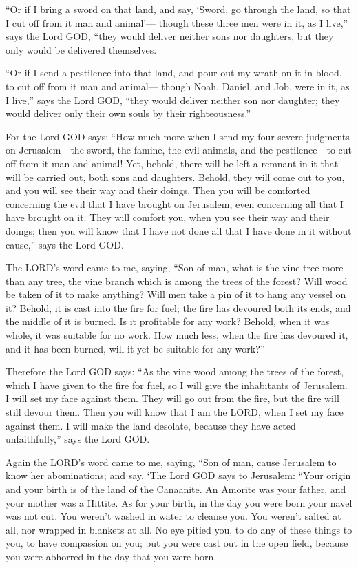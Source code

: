 \myverse{}“Or if I bring a sword on that land, and say, ‘Sword, go through
the land, so that I cut off from it man and animal’—
\myverse{}though these three men were in it, as I live,” says the Lord GOD, “they would
deliver neither sons nor daughters, but they only would be delivered themselves.

\myverse{}“Or if I send a pestilence into that land, and pour out my wrath
on it in blood, to cut off from it man and animal—
\myverse{}though Noah, Daniel, and Job, were in it, as I live,” says the Lord GOD,
“they would deliver neither son nor daughter; they would deliver only their own souls by their righteousness.”

\myverse{}For the Lord GOD says: “How much more when I send my four severe
judgments on Jerusalem—the sword, the famine, the evil animals, and the pestilence—to cut off from it
man and animal!
\myverse{}Yet, behold, there will be left a remnant in it that will be carried out,
both sons and daughters. Behold, they will come out to you, and you will see their way and their doings.
Then you will be comforted concerning the evil that I have brought on Jerusalem, even concerning all that
I have brought on it.
\myverse{}They will comfort you, when you see their way and their doings; then you
will know that I have not done all that I have done in it without cause,” says the Lord GOD.


\mychapter{} \myverse*{}The LORD’s word came to me, saying,
\myverse{}“Son of man, what is the vine tree more than any tree, the vine branch which
is among the trees of the forest?
\myverse{}Will wood be taken of it to make anything? Will men take a pin of it to hang
any vessel on it?
\myverse{}Behold, it is cast into the fire for fuel; the fire has devoured both its ends,
and the middle of it is burned. Is it profitable for any work?
\myverse{}Behold, when it was whole, it was suitable for no work. How much less, when
the fire has devoured it, and it has been burned, will it yet be suitable for any work?”

\myverse{}Therefore the Lord GOD says: “As the vine wood among the trees
of the forest, which I have given to the fire for fuel, so I will give the inhabitants of Jerusalem.
\myverse{}I will set my face against them. They will go out from the fire, but the fire
will still devour them. Then you will know that I am the LORD, when I set my face against them.
\myverse{}I will make the land desolate, because they have acted unfaithfully,” says
the Lord GOD.


\mychapter{} \myverse*{}Again the LORD’s word came to me, saying,
\myverse{}“Son of man, cause Jerusalem to know her abominations;
\myverse{}and say, ‘The Lord GOD says to Jerusalem: “Your origin and your birth is of
the land of the Canaanite. An Amorite was your father, and your mother was a Hittite.
\myverse{}As for your birth, in the day you were born your navel was not cut. You weren’t
washed in water to cleanse you. You weren’t salted at all, nor wrapped in blankets at all.
\myverse{}No eye pitied you, to do any of these things to you, to have compassion on
you; but you were cast out in the open field, because you were abhorred in the day that you were born.


